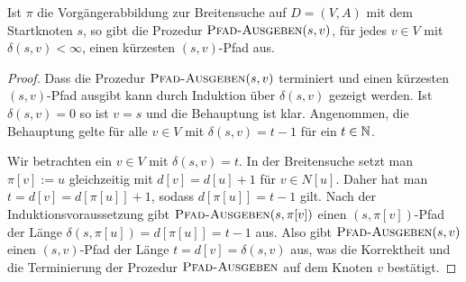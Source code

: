 \begin{prop}
	Ist $\pi$ die Vorgängerabbildung zur Breitensuche auf $D=(V,A)$ mit dem Startknoten $s$, so gibt die Prozedur $\mathop{\text{\textsc{Pfad-Ausgeben}}}(s,v)$, für jedes $v \in V$ mit $\delta(s,v)<\infty$, einen kürzesten $(s,v)$-Pfad aus.
\end{prop}
\begin{proof} 
 Dass die Prozedur $\mathop{\text{\textsc{Pfad-Ausgeben}}}(s,v)$ terminiert und einen kürzesten $(s,v)$-Pfad ausgibt kann durch Induktion über $\delta(s,v)$ gezeigt werden.
 Ist $\delta(s,v)=0$ so ist $v=s$ und die Behauptung ist klar.
 Angenommen, die Behauptung gelte für alle $v \in V$ mit $\delta(s,v)=t-1$ für ein $t \in \mathbb{N}$. 

Wir betrachten ein $v \in V$ mit $\delta(s,v) = t$.
In der Breitensuche setzt man  $\pi[v] := u$ gleichzeitig mit $d[v] = d[u]+1$ für $v \in N[u]$. Daher hat man $t = d[v] = d[\pi[u]] + 1 $, sodass $d[\pi[u]]=t-1$ gilt. Nach der Induktionsvoraussetzung  gibt $\mathop{\text{\textsc{Pfad-Ausgeben}}}(s,\pi[v])$ einen $(s,\pi[v])$-Pfad der L\"ange $\delta(s,\pi[u]) = d[\pi[u]]  = t-1$ aus. Also gibt $\mathop{\text{\textsc{Pfad-Ausgeben}}}(s,v)$ einen $(s,v)$-Pfad der Länge $t = d[v] = \delta(s,v)$ aus, was die Korrektheit und die Terminierung der Prozedur $\mathop{\text{\textsc{Pfad-Ausgeben}}}$ auf dem Knoten $v$ bestätigt. 
\end{proof} 



